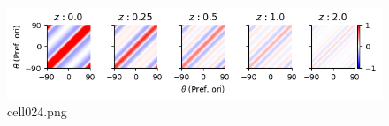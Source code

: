 \begin{figure}[ht]
	\centering
	\includegraphics[scale=0.8, max width=\linewidth]{./fig/bayesian-brain/neural-sampling/cell024.png}
	\caption{cell024.png}
	\label{cell024.png}
\end{figure}